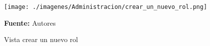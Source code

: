 \begin{figure}[!htb]
  \begin{center}
\texttt{[image: ./imagenes/Administracion/crear\_un\_nuevo\_rol.png]}
    \caption{Vista crear un nuevo rol}
    \label{fig:Vista_crear_un_nuevo_rol}
    \textbf{Fuente:}  Autores
  \end{center}
\end{figure}

